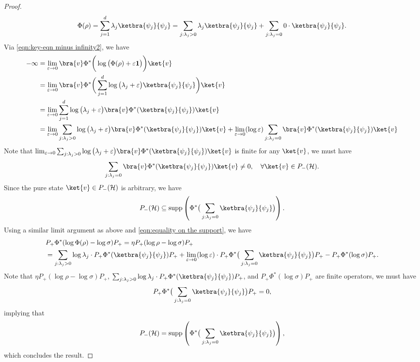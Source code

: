 \documentclass[11pt,reqno]{amsart}
\numberwithin{equation}{section}
\newcommand{\mc}{\mathcal}
\begin{document}
\begin{proof}
\begin{align*}
    \Phi(\rho) = \sum_{j=1}^d \lambda_j \ketbra{\psi_j}{\psi_j} = \sum_{j: \lambda_j>0} \lambda_j \ketbra{\psi_j}{\psi_j} + \sum_{j: \lambda_j = 0} 0\cdot \ketbra{\psi_j}{\psi_j}.
\end{align*}
Via \eqref{eqn:key-eqn minus infinity2}, we have 
\begin{align*}
    -\infty & = \lim_{\varepsilon \to 0} \bra{v} \Phi^*\bigg( \log \big( \Phi(\rho ) + \varepsilon \textbf{1}\big) \bigg) \ket{v} \\
    & = \lim_{\varepsilon \to 0} \bra{v} \Phi^*\bigg( \sum_{j=1}^d\log \big(  \lambda_j+\varepsilon \big) \ketbra{\psi_j}{\psi_j}  \bigg) \ket{v} \\
    & = \lim_{\varepsilon \to 0} \sum_{j=1}^d\log \big(  \lambda_j+\varepsilon \big) \bra{v} \Phi^*( \ketbra{\psi_j}{\psi_j}) \ket{v} \\
    & = \lim_{\varepsilon \to 0} \sum_{j: \lambda_j > 0}\log \big(  \lambda_j+\varepsilon \big) \bra{v} \Phi^*( \ketbra{\psi_j}{\psi_j}) \ket{v} + \lim_{\varepsilon \to 0} (\log \varepsilon)  \sum_{j: \lambda_j = 0}\bra{v} \Phi^*( \ketbra{\psi_j}{\psi_j}) \ket{v}
\end{align*}
Note that $\lim_{\varepsilon \to 0} \sum_{j: \lambda_j > 0}\log \big(  \lambda_j+\varepsilon \big) \bra{v} \Phi^*( \ketbra{\psi_j}{\psi_j}) \ket{v} $ is finite for any $\ket{v}$, we must have 
\begin{align*}
    \sum_{j: \lambda_j = 0}\bra{v} \Phi^*( \ketbra{\psi_j}{\psi_j}) \ket{v} \neq 0,\quad \forall \ket{v} \in P_-(\mc H).
\end{align*}
Since the pure state $\ket{v} \in P_-(\mc H)$ is arbitrary, we have 
\begin{align*}
    P_-(\mc H) \subseteq \mathrm{supp}\left(\Phi^*\big(\sum_{j: \lambda_j = 0} \ketbra{\psi_j}{\psi_j} \big) \right).
\end{align*}
Using a similar limit argument as above and \eqref{eqn:equality on the support}, we have 
\begin{align*}
    & P_+ \Phi^*(\log \Phi(\rho) - \log \sigma) P_+ = \eta P_+ (\log \rho - \log \sigma)P_+\\
    & = \sum_{j: \lambda_j >0} \log \lambda_j\cdot P_+ \Phi^*(\ketbra{\psi_j}{\psi_j})P_+ + \lim_{\varepsilon\to 0}(\log \varepsilon)\cdot P_+\Phi^*\big(\sum_{j: \lambda_j = 0} \ketbra{\psi_j}{\psi_j} \big)P_+ - P_+ \Phi^*(\log \sigma)P_+.
\end{align*}
Note that $\eta P_+ (\log \rho - \log \sigma)P_+$, $ \sum_{j: \lambda_j >0} \log \lambda_j\cdot P_+ \Phi^*(\ketbra{\psi_j}{\psi_j})P_+$, and $P_+ \Phi^*(\log \sigma)P_+$ are finite operators, we must have \begin{align*}
    P_+\Phi^*\big(\sum_{j: \lambda_j = 0} \ketbra{\psi_j}{\psi_j} \big)P_+ = 0,
\end{align*}
implying that 
\begin{align*}
    P_-(\mc H) = \mathrm{supp}\left(\Phi^*\big(\sum_{j: \lambda_j = 0} \ketbra{\psi_j}{\psi_j} \big) \right),
\end{align*}
which concludes the result.
\end{proof}
\end{document}
